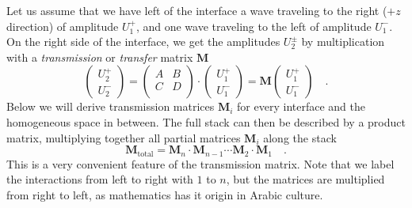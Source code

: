 Let us assume that we have left of the interface a wave traveling to the right ($+z$ direction) of amplitude $U_1^+$, and one wave traveling to the left of amplitude $U_1^-$. On the right side of the interface, we get the amplitudes $U_2^\pm$ by multiplication with a \emph{transmission} or \emph{transfer} matrix $\mathbf{M}$
\begin{equation}
\begin{pmatrix}
U_2^+ \\ U_2^-
\end{pmatrix}
= 
\begin{pmatrix}
A & B \\ C & D \\
\end{pmatrix}
\cdot
\begin{pmatrix}
U_1^+ \\ U_1^-
\end{pmatrix}
%
= \mathbf{M}
\begin{pmatrix}
U_1^+ \\ U_1^-
\end{pmatrix} \quad . \label{eq:6_def_T_matrix}
\end{equation}
Below we will derive transmission matrices $\mathbf{M}_i$ for every interface and the homogeneous space in between. The full stack can then be described by a product matrix, multiplying together all partial matrices $\mathbf{M}_i$ along the stack
\begin{equation}
\mathbf{M}_\text{total} = \mathbf{M}_n \cdot  \mathbf{M}_{n-1} \cdots\mathbf{M}_2 \cdot  \mathbf{M}_{1} \quad . 
\end{equation}
This is a very convenient feature of the transmission matrix.
Note that we label the interactions from left to right with $1$ to $n$, but the matrices are multiplied from right to left, as mathematics has it origin in Arabic culture.




